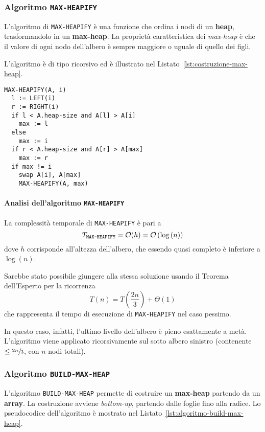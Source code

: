 \documentclass[italian, 10pt]{article}
\begin{document}
\subsubsection{Algoritmo \texttt{MAX-HEAPIFY}}
\label{sec:algoritmo-max-heapify}

L'algoritmo di \texttt{MAX-HEAPIFY} è una funzione che ordina i nodi di un \textbf{heap}, trasformandolo in un \textbf{max-heap}.
La proprietà caratteristica dei \textit{max-heap} è che il valore di ogni nodo dell'albero è sempre maggiore o uguale di quello dei figli.

L'algoritmo è di tipo ricorsivo ed è illustrato nel Listato~\ref{lst:costruzione-max-heap}.

\begin{lstlisting}[style=pseudocode, caption={Costruzione di un \texttt{MAX-HEAP}}, label={lst:costruzione-max-heap}]
MAX-HEAPIFY(A, i)
  l := LEFT(i)
  r := RIGHT(i)
  if l < A.heap-size and A[l] > A[i]
    max := l
  else
    max := i
  if r < A.heap-size and A[r] > A[max]
    max := r
  if max != i
    swap A[i], A[max]
    MAX-HEAPIFY(A, max)
\end{lstlisting}

\paragraph{Analisi dell'algoritmo \texttt{MAX-HEAPIFY}}

La complessità temporale di \texttt{MAX-HEAPIFY} è pari a
\[ T_{\texttt{MAX-HEAPIFY}} = \mathcal{O}(h) = \mathcal{O}\left(\log{(n)}\right) \]
dove \(h\) corrisponde all'altezza dell'albero, che essendo quasi completo è inferiore a \(\log{(n)}\).

\bigskip
Sarebbe stato possibile giungere alla stessa soluzione usando il Teorema dell'Esperto per la ricorrenza
\[ T(n) = T\left(\dfrac{2n}{3}\right) + \Theta(1) \]
che rappresenta il tempo di esecuzione di \texttt{MAX-HEAPIFY} nel caso pessimo.

In questo caso, infatti, l'ultimo livello dell'albero è pieno esattamente a metà.
L'algoritmo viene applicato ricorsivamente sul sotto albero sinistro (contenente \(\leq \sfrac{2n}{3}\), con \(n\) nodi totali).

\subsubsection{Algoritmo \texttt{BUILD-MAX-HEAP}}
\label{sec:algoritmo-build-max-heap}

L'algoritmo \texttt{BUILD-MAX-HEAP} permette di costruire un \textbf{max-heap} partendo da un \textbf{array}.
La costruzione avviene \textit{bottom-up}, partendo dalle foglie fino alla radice.
Lo pseudocodice dell'algoritmo è mostrato nel Listato~\ref{lst:algoritmo-build-max-heap}.
\end{document}
